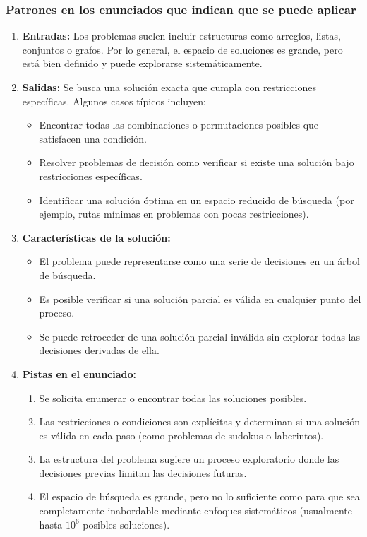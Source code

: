 \subsubsection{Patrones en los enunciados que indican que se puede aplicar}  
\begin{enumerate}  
  \item \textbf{Entradas:} Los problemas suelen incluir estructuras como arreglos, listas, conjuntos o grafos. Por lo general, el espacio de soluciones es grande, pero está bien definido y puede explorarse sistemáticamente.  
  \item \textbf{Salidas:} Se busca una solución exacta que cumpla con restricciones específicas. Algunos casos típicos incluyen:  
  \begin{itemize}  
    \item Encontrar todas las combinaciones o permutaciones posibles que satisfacen una condición.  
    \item Resolver problemas de decisión como verificar si existe una solución bajo restricciones específicas.  
    \item Identificar una solución óptima en un espacio reducido de búsqueda (por ejemplo, rutas mínimas en problemas con pocas restricciones).  
  \end{itemize}  
  \item \textbf{Características de la solución:}  
  \begin{itemize}  
    \item El problema puede representarse como una serie de decisiones en un árbol de búsqueda.  
    \item Es posible verificar si una solución parcial es válida en cualquier punto del proceso.  
    \item Se puede retroceder de una solución parcial inválida sin explorar todas las decisiones derivadas de ella.  
  \end{itemize}  
  \item \textbf{Pistas en el enunciado:}  
  \begin{enumerate}  
    \item Se solicita enumerar o encontrar todas las soluciones posibles.  
    \item Las restricciones o condiciones son explícitas y determinan si una solución es válida en cada paso (como problemas de sudokus o laberintos).  
    \item La estructura del problema sugiere un proceso exploratorio donde las decisiones previas limitan las decisiones futuras.  
    \item El espacio de búsqueda es grande, pero no lo suficiente como para que sea completamente inabordable mediante enfoques sistemáticos (usualmente hasta $10^6$ posibles soluciones).  
  \end{enumerate}  
\end{enumerate}  

